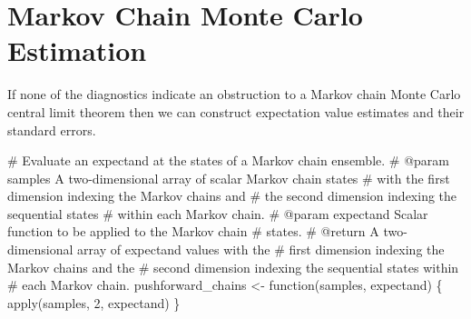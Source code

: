 \documentclass[
  letterpaper,
  DIV=11,
  numbers=noendperiod]{scrartcl}
\newenvironment{Shaded}{\begin{snugshade}}{\end{snugshade}}
\newcommand{\BuiltInTok}[1]{\textcolor[rgb]{0.00,0.23,0.31}{#1}}
\newcommand{\CommentTok}[1]{\textcolor[rgb]{0.37,0.37,0.37}{#1}}
\newcommand{\DecValTok}[1]{\textcolor[rgb]{0.68,0.00,0.00}{#1}}
\newcommand{\NormalTok}[1]{\textcolor[rgb]{0.00,0.23,0.31}{#1}}
\newcommand{\OperatorTok}[1]{\textcolor[rgb]{0.37,0.37,0.37}{#1}}
\begin{document}
\hypertarget{markov-chain-monte-carlo-estimation}{%
\section{Markov Chain Monte Carlo
Estimation}\label{markov-chain-monte-carlo-estimation}}

If none of the diagnostics indicate an obstruction to a Markov chain
Monte Carlo central limit theorem then we can construct expectation
value estimates and their standard errors.

\begin{Shaded}
\begin{Highlighting}[]
\CommentTok{\# Evaluate an expectand at the states of a Markov chain ensemble.}
\CommentTok{\# @param samples A two{-}dimensional array of scalar Markov chain states }
\CommentTok{\#                with the first dimension indexing the Markov chains and }
\CommentTok{\#                the second dimension indexing the sequential states }
\CommentTok{\#                within each Markov chain.}
\CommentTok{\# @param expectand Scalar function to be applied to the Markov chain }
\CommentTok{\#                  states.}
\CommentTok{\# @return A two{-}dimensional array of expectand values with the }
\CommentTok{\#         first dimension indexing the Markov chains and the }
\CommentTok{\#         second dimension indexing the sequential states within }
\CommentTok{\#         each Markov chain.}
\NormalTok{pushforward\_chains }\OperatorTok{\textless{}{-}}\NormalTok{ function(samples, expectand) \{}
  \BuiltInTok{apply}\NormalTok{(samples, }\DecValTok{2}\NormalTok{, expectand)}
\NormalTok{\}}
\end{Highlighting}
\end{Shaded}
\end{document}
